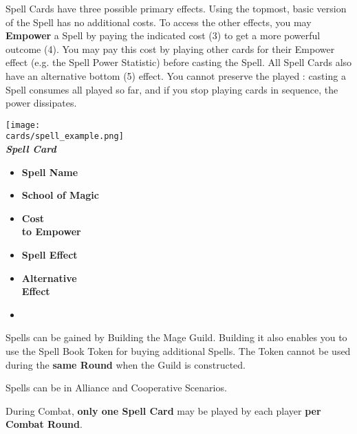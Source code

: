 \begin{multicols*}{2}
Spell Cards have three possible primary effects.
Using the topmost, basic version of the Spell has no additional costs.
To access the other effects, you may \textbf{Empower} a Spell by paying the indicated cost (3) to get a more powerful outcome (4).
You may pay this cost by playing other cards for their Empower  effect (e.g. the Spell Power Statistic) before casting the Spell.
All Spell Cards also have an alternative bottom (5)  effect.
You cannot preserve the played : casting a Spell consumes all  played so far, and if you stop playing cards in sequence, the power dissipates.\par

{
  \centering
  \texttt{[image: \\cards/spell\_example.png]}\\
  \medskip
  \footnotesize{\textbf{\textit{\textcolor{darkcandyapplered}{Spell Card}}}}
  \scriptsize
  \begin{multicols}{2}
    \begin{itemize}[itemsep=5pt]
      \item[\textbf{1.}] \textbf{Spell Name}
      \item[\textbf{2.}] \textbf{School of Magic}
      \item[\textbf{3.}] \textbf{Cost\\to Empower}
      \item[\textbf{4.}] \textbf{Spell Effect}
      \item[\textbf{5.}] \textbf{Alternative\\Effect}
      \item[]
    \end{itemize}
  \end{multicols}
}

Spells can be gained by Building the Mage Guild.
Building it also enables you to use the Spell Book Token for buying additional Spells.
The Token cannot be used during the \textbf{same Round} when the Guild is constructed.\par
Spells can be  in Alliance and Cooperative Scenarios.

During Combat, \textbf{only one Spell Card} may be played by each player \textbf{per Combat Round}.



\end{multicols*}
